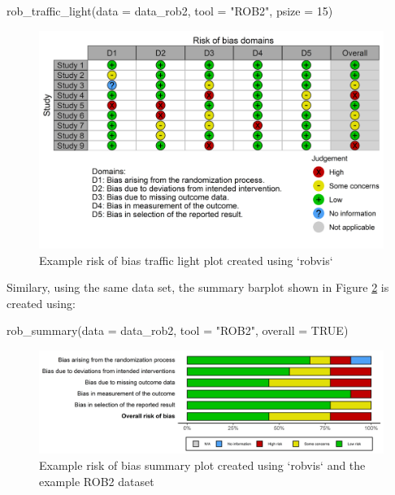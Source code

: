 \documentclass[a4paper, twoside]{templates/ociamthesis}
\newenvironment{Shaded}{\begin{snugshade}}{\end{snugshade}}
\newcommand{\AttributeTok}[1]{\textcolor[rgb]{0.77,0.63,0.00}{#1}}
\newcommand{\ConstantTok}[1]{\textcolor[rgb]{0.00,0.00,0.00}{#1}}
\newcommand{\DecValTok}[1]{\textcolor[rgb]{0.00,0.00,0.81}{#1}}
\newcommand{\FunctionTok}[1]{\textcolor[rgb]{0.00,0.00,0.00}{#1}}
\newcommand{\NormalTok}[1]{#1}
\newcommand{\StringTok}[1]{\textcolor[rgb]{0.31,0.60,0.02}{#1}}
\renewenvironment{Shaded}
{
  \vspace{4pt}%
  \begin{snugshade}%
}{%
  \end{snugshade}%
  \vspace{4pt}%
}
\begin{document}
\begin{Shaded}
\begin{Highlighting}[]
\FunctionTok{rob\_traffic\_light}\NormalTok{(}\AttributeTok{data =}\NormalTok{ data\_rob2,}
                  \AttributeTok{tool =} \StringTok{"ROB2"}\NormalTok{,}
                  \AttributeTok{psize =} \DecValTok{15}\NormalTok{)}
\end{Highlighting}
\end{Shaded}

\begin{figure}
\includegraphics[width=1\linewidth]{figures/sys-rev-tools/example-rob-traffic-light-plot} \caption{Example risk of bias traffic light plot created using `robvis`}\label{fig:trafficplot}
\end{figure}

Similary, using the same data set, the summary barplot shown in Figure \ref{fig:summaryplot} is created using:

\begin{Shaded}
\begin{Highlighting}[]
\FunctionTok{rob\_summary}\NormalTok{(}\AttributeTok{data =}\NormalTok{ data\_rob2,}
            \AttributeTok{tool =} \StringTok{"ROB2"}\NormalTok{, }
            \AttributeTok{overall =} \ConstantTok{TRUE}\NormalTok{)}
\end{Highlighting}
\end{Shaded}

\begin{figure}
\includegraphics[width=1\linewidth]{figures/sys-rev-tools/example-rob-summary-barplot} \caption{Example risk of bias summary plot created using `robvis` and the example ROB2 dataset}\label{fig:summaryplot}
\end{figure}
\end{document}
